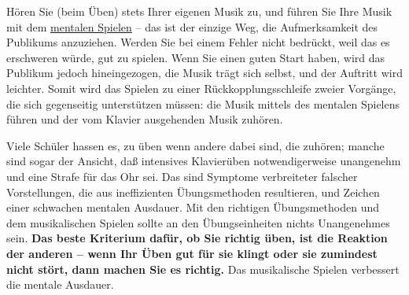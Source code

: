 Hören Sie (beim Üben) stets Ihrer eigenen Musik zu, und führen Sie Ihre Musik mit dem \hyperref[c1ii12mental]{mentalen Spielen} -- das ist der einzige Weg, die Aufmerksamkeit des Publikums anzuziehen.
Werden Sie bei einem Fehler nicht bedrückt, weil das es erschweren würde, gut zu spielen.
Wenn Sie einen guten Start haben, wird das Publikum jedoch hineingezogen, die Musik trägt sich selbst, und der Auftritt wird leichter.
Somit wird das Spielen zu einer Rückkopplungsschleife zweier Vorgänge, die sich gegenseitig unterstützen müssen: die Musik mittels des mentalen Spielens führen und der vom Klavier ausgehenden Musik zuhören.

Viele Schüler hassen es, zu üben wenn andere dabei sind, die zuhören; manche sind sogar der Ansicht, daß intensives Klavierüben notwendigerweise unangenehm und eine Strafe für das Ohr sei.
Das sind Symptome verbreiteter falscher Vorstellungen, die aus ineffizienten Übungsmethoden resultieren, und Zeichen einer schwachen mentalen Ausdauer.
Mit den richtigen Übungsmethoden und dem musikalischen Spielen sollte an den Übungseinheiten nichts Unangenehmes sein.
\textbf{Das beste Kriterium dafür, ob Sie richtig üben, ist die Reaktion der anderen -- wenn Ihr Üben gut für sie klingt oder sie zumindest nicht stört, dann machen Sie es richtig.}
Das musikalische Spielen verbessert die mentale Ausdauer.



